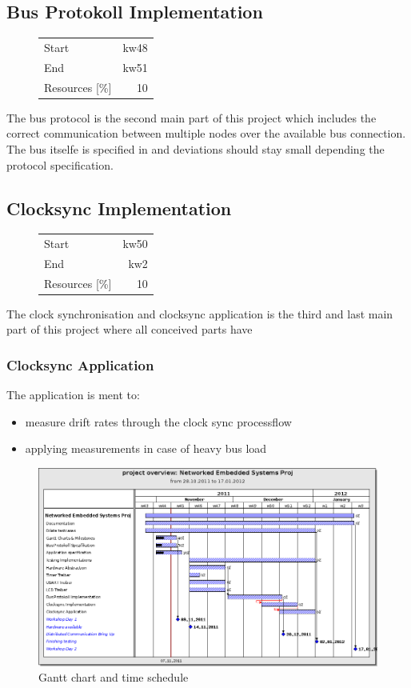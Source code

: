 \subsection{Bus Protokoll Implementation}
\begin{figure}
\begin{tabular}[t]{|lr|}
\hline
Start & kw48\\
End & kw51\\
Resources [\%] & 10\\
\hline
\end{tabular}
\end{figure}
The bus protocol is the second main part of this project which includes the correct communication
between multiple nodes over the available bus connection. 
The bus itselfe is specified in \cite [NESD2]{NESD2} and deviations should stay small depending 
the protocol specification.
\subsection{Clocksync Implementation}
\begin{figure}
\begin{tabular}[t]{|lr|}
\hline
Start & kw50\\
End & kw2\\
Resources [\%] & 10\\
\hline
\end{tabular}
\end{figure}
The clock synchronisation and clocksync application is the third and last main part of 
this project where all conceived parts have
\subsubsection{Clocksync Application}
The application is ment to:
\begin{itemize}
 \item measure drift rates through the clock sync processflow
 \item applying measurements in case of heavy bus load
\end{itemize}

\begin{figure}[ht]
 \centering
 \includegraphics[angle=90,scale=0.6,keepaspectratio=true]{./images/201111_ganttchart.png}
 \caption{Gantt chart and time schedule}
 \label{fig:gantt chart}
\end{figure}
